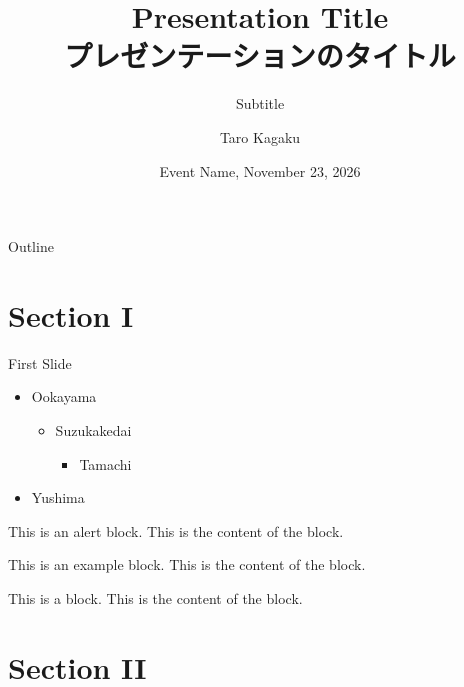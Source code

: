 \documentclass[10pt,aspectratio=169]{beamer}
\title{Presentation Title\\プレゼンテーションのタイトル}
\subtitle{Subtitle}
\author{Taro Kagaku}
\institute{Department of Computer Science, Institute of Science Tokyo}
\date{Event Name, November 23, 2026}
\begin{document}
\maketitle

\begin{frame}{Outline}
  \tableofcontents
\end{frame}

\section{Section I}

\begin{frame}{First Slide}
  \begin{itemize}
  \item Ookayama
    \begin{itemize}
    \item Suzukakedai
      \begin{itemize}
      \item Tamachi
      \end{itemize}
    \end{itemize}
  \item Yushima
  \end{itemize}

  \begin{alertblock}{This is an alert block.}
    This is the content of the block.
  \end{alertblock}

  \begin{exampleblock}{This is an example block.}
    This is the content of the block.
  \end{exampleblock}

  \begin{block}{This is a block.}
    This is the content of the block.
  \end{block}
\end{frame}

\section{Section II}
\end{document}
